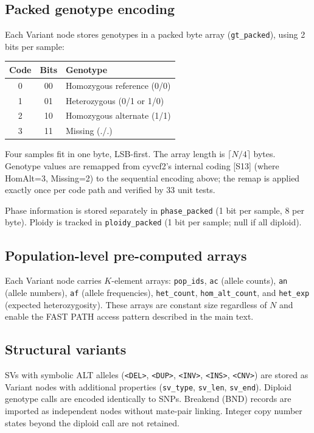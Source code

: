 \documentclass[11pt,a4paper]{article}
\begin{document}
\subsection*{Packed genotype encoding}

Each Variant node stores genotypes in a packed byte array (\texttt{gt\_packed}), using 2 bits per sample:

\begin{tabular}{ccl}
\toprule
Code & Bits & Genotype \\
\midrule
0 & 00 & Homozygous reference (0/0) \\
1 & 01 & Heterozygous (0/1 or 1/0) \\
2 & 10 & Homozygous alternate (1/1) \\
3 & 11 & Missing (./.) \\
\bottomrule
\end{tabular}

\vspace{6pt}
Four samples fit in one byte, LSB-first. The array length is $\lceil N/4 \rceil$ bytes. Genotype values are remapped from cyvcf2's internal coding [S13] (where HomAlt=3, Missing=2) to the sequential encoding above; the remap is applied exactly once per code path and verified by 33 unit tests.

Phase information is stored separately in \texttt{phase\_packed} (1 bit per sample, 8 per byte). Ploidy is tracked in \texttt{ploidy\_packed} (1 bit per sample; null if all diploid).

\subsection*{Population-level pre-computed arrays}

Each Variant node carries $K$-element arrays: \texttt{pop\_ids}, \texttt{ac} (allele counts), \texttt{an} (allele numbers), \texttt{af} (allele frequencies), \texttt{het\_count}, \texttt{hom\_alt\_count}, and \texttt{het\_exp} (expected heterozygosity). These arrays are constant size regardless of $N$ and enable the FAST PATH access pattern described in the main text.

\subsection*{Structural variants}

SVs with symbolic ALT alleles (\texttt{<DEL>}, \texttt{<DUP>}, \texttt{<INV>}, \texttt{<INS>}, \texttt{<CNV>}) are stored as Variant nodes with additional properties (\texttt{sv\_type}, \texttt{sv\_len}, \texttt{sv\_end}). Diploid genotype calls are encoded identically to SNPs. Breakend (BND) records are imported as independent nodes without mate-pair linking. Integer copy number states beyond the diploid call are not retained.
\end{document}
